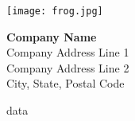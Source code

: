 \documentclass{article}
\begin{document}
\begin{figure*}[t]
    \centering
    \begin{minipage}[t]{0.3\textwidth}
        \vspace{0pt} %
        \texttt{[image: frog.jpg]}
    \end{minipage}
    \hfill
    \begin{minipage}[t]{0.6\textwidth}
        \vspace{0pt} %
        \raggedleft
        {\LARGE\textbf{Company Name}} \\
        \raggedleft
        Company Address Line 1 \\
        Company Address Line 2 \\
        City, State, Postal Code
    \end{minipage}
\end{figure*}


{{data}}

\end{document}
